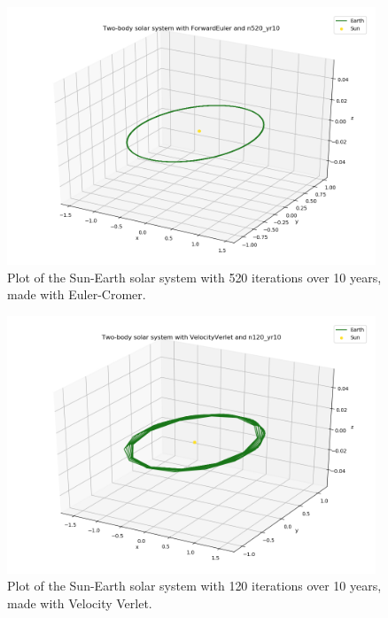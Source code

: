 \documentclass{article}
\begin{document}
    \begin{figure}[H]
        \centering
        \includegraphics[width = 11cm]{img/plot3D_S_E_F_n520_yr10.png}
        \caption{Plot of the Sun-Earth solar system with 520 iterations over 10 years, made with Euler-Cromer. }
        \label{fig:plot3D_S_E_F_n520_yr10}
    \end{figure}

    \begin{figure}[H]
        \centering
        \includegraphics[width = 11cm]{img/plot3D_S_E_V_n120_yr10.png}
        \caption{Plot of the Sun-Earth solar system with 120 iterations over 10 years, made with Velocity Verlet. }
        \label{fig:plot3D_S_E_V_n120_yr10}
    \end{figure}
\end{document}
